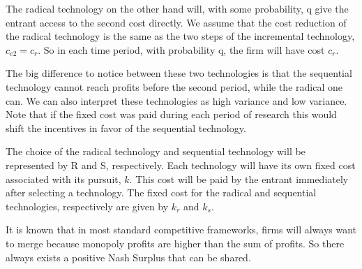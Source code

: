 \documentclass[11pt]{article}
\begin{document}

The radical technology on the other hand will, with some probability, q give the entrant access to the second cost directly. We assume that the cost reduction of the radical technology is the same as the two steps of the incremental technology, $c_{e2}=c_r$. So in each time period, with probability q, the firm will have cost $c_r$. 


\begin{comment}\begin{tikzpicture}
    [%
        node distance =.8cm,
        place/.style={rectangle,draw=blue!50,fill=blue!20,thick,
                      inner sep=0pt,minimum size=6mm}
    ]%
    \node[place] (1) {$c_{e1}$};
    \node[place] (2) [right=of 1] {$c_{e2}$};
    
    \draw [->,thick] (1.south west) to [bend left=55]  node[left]  {(1-q)}    (1.north west);
    \draw [->,thick] (1.north east) to [bend left=15]  node[above] {q}  (2.north west);

\end{tikzpicture}
\end{comment}

The big difference to notice between these two technologies is that the sequential technology cannot reach profits before the second period, while the radical one can. We can also interpret these technologies as high variance and low variance. Note that if the fixed cost was paid during each period of research this would shift the incentives in favor of the sequential technology. 


The choice of the radical technology and sequential technology will be represented by R and S, respectively. Each technology will have its own fixed cost associated with its pursuit, $k$. This cost will be paid by the entrant immediately after selecting a technology. The fixed cost for the radical and sequential technologies, respectively are given by $k_r$ and $k_s$. 



It is known that in most standard competitive frameworks, firms will always want to merge because monopoly profits are higher than the sum of profits. So there always exists a positive Nash Surplus that can be shared. 
\end{document}

